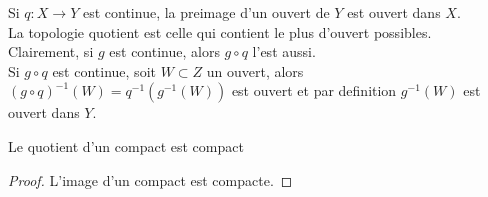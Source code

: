 \documentclass[../main.tex]{subfiles}
\begin{document}
\begin{propo}
Si $q:X\to Y$ est continue, la preimage d'un ouvert de $Y$ est ouvert dans $X$.\\
La topologie quotient est celle qui contient le plus d'ouvert possibles.\\
Clairement, si $g$ est continue, alors $g\circ q$ l'est aussi.\\
Si $g\circ q$ est continue, soit $W \subset Z$ un ouvert, alors $( g\circ q )^{-1}( W) = q^{-1}( g^{-1}( W) ) $ est ouvert et par definition $g^{-1}( W) $ est ouvert dans $Y$.
\end{propo}
\begin{propo}
Le quotient d'un compact est compact
\end{propo}
\begin{proof}
L'image d'un compact est compacte.
\end{proof}
\end{document}
